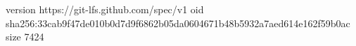 version https://git-lfs.github.com/spec/v1
oid sha256:33cab9f47de010b0d7d9f6862b05da0604671b48b5932a7aed614e162f59b0ac
size 7424
